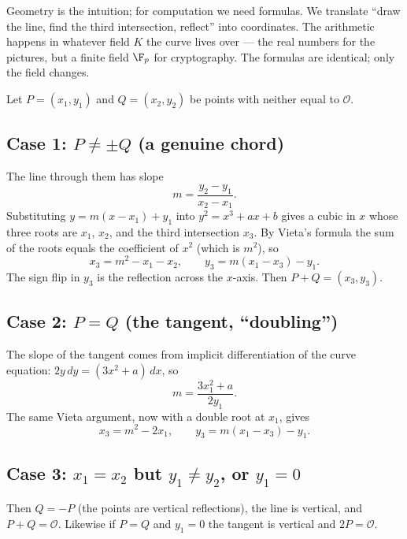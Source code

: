 Geometry is the intuition; for computation we need formulas. We translate ``draw the
line, find the third intersection, reflect'' into coordinates. The arithmetic happens
in whatever field $K$ the curve lives over --- the real numbers for the pictures, but a
finite field $\F_p$ for cryptography. The formulas are identical; only the field
changes.

Let $P=(x_1,y_1)$ and $Q=(x_2,y_2)$ be points with neither equal to $\mathcal{O}$.

\subsection*{Case 1: $P \neq \pm Q$ (a genuine chord)}

The line through them has slope
\[
m = \frac{y_2 - y_1}{x_2 - x_1}.
\]
Substituting $y = m(x-x_1)+y_1$ into $y^2 = x^3+ax+b$ gives a cubic in $x$ whose three
roots are $x_1$, $x_2$, and the third intersection $x_3$. By Vieta's formula the sum of
the roots equals the coefficient of $x^2$ (which is $m^2$), so
\begin{equation}
\label{ch21:add-x}
x_3 = m^2 - x_1 - x_2, \qquad y_3 = m(x_1 - x_3) - y_1.
\end{equation}
The sign flip in $y_3$ is the reflection across the $x$-axis. Then $P+Q=(x_3,y_3)$.

\subsection*{Case 2: $P = Q$ (the tangent, ``doubling'')}

The slope of the tangent comes from implicit differentiation of the curve equation:
$2y\,dy = (3x^2+a)\,dx$, so
\[
m = \frac{3x_1^2 + a}{2y_1}.
\]
The same Vieta argument, now with a double root at $x_1$, gives
\begin{equation}
\label{ch21:double-x}
x_3 = m^2 - 2x_1, \qquad y_3 = m(x_1 - x_3) - y_1.
\end{equation}

\subsection*{Case 3: $x_1 = x_2$ but $y_1 \neq y_2$, or $y_1 = 0$}

Then $Q=-P$ (the points are vertical reflections), the line is vertical, and
$P + Q = \mathcal{O}$. Likewise if $P=Q$ and $y_1=0$ the tangent is vertical and
$2P = \mathcal{O}$.

